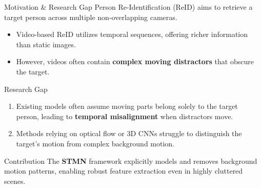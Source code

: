\begin{frame}{Motivation \& Research Gap}
    Person Re-Identification (ReID) aims to retrieve a target person across multiple non-overlapping cameras.
    \smallskip
    \begin{itemize}\setlength\itemsep{2pt}
        \item Video-based ReID utilizes temporal sequences, offering richer information than static images.
        \item However, videos often contain \textbf{complex moving distractors} that obscure the target.
    \end{itemize}

    \smallskip
    \begin{alertblock}{Research Gap}
        \vspace{-0pt}
        \begin{enumerate}\setlength\itemsep{2pt}
            \item Existing models often assume moving parts belong solely to the target person, leading to \textbf{temporal misalignment} when distractors move.
            \item Methods relying on optical flow or 3D CNNs struggle to distinguish the target's motion from complex background motion.
        \end{enumerate}
        \vspace{-0pt}
    \end{alertblock}

    \begin{exampleblock}{Contribution}
        \vspace{-2pt}
        The \textbf{STMN} framework explicitly models and removes background motion patterns, enabling robust feature extraction even in highly cluttered scenes.
        \vspace{-2pt}
    \end{exampleblock}
\end{frame}
